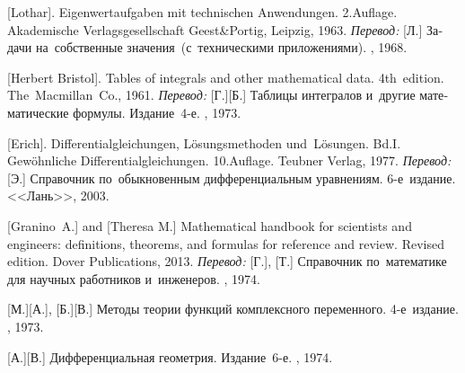 \begin{thebibliography}{123}
\begin{otherlanguage}{russian}

[Lothar]. Eigenwertaufgaben mit technischen Anwendungen. 2.\:Auflage. Akademische Verlagsgesellschaft Geest\;\&\;Portig, Leipzig, 1963. 
\emph{Перевод:} [Л.] Задачи на~собственные значения~(с~техническими приложениями). \naukapublisher, 1968. 

[Herbert Bristol]. Tables of integrals and other mathematical data. 4th~edition. The~Macmillan~Co., 1961. 
\emph{Перевод:} [Г.][Б.] Таблицы интегралов и~другие математические формулы. Издание~4\hbox{-}е. \naukapublisher, 1973. 

[Erich]. Differentialgleichungen, Lösungsmethoden und~Lö\-sun\-gen. Bd.\:I. Gewöhnliche Differentialgleichungen. 10.\:Auflage. Teubner Verlag, 1977. 
\emph{Перевод:} [Э.] Справочник по~обыкновенным дифференциальным уравнениям. 6\hbox{-}е~издание. <<Лань>>, 2003. 

[Granino~A.] and [Theresa M.]
Mathematical handbook for scientists and engineers: definitions, theorems, and formulas for reference and review.
Revised edition. Dover Publications, 2013. 
\emph{Перевод:}
[Г.],
[Т.]
Справочник по~математике для научных работников и~инженеров.
\naukapublisher,
1974.

[М.][А.],
[Б.][В.]
Методы теории функций комплексного переменного.
4\hbox{-}е~издание.
\naukapublisher,
1973.

[А.][В.]
Дифференциальная геометрия.
Издание~6\hbox{-}е.
\naukapublisher,
1974.

\end{otherlanguage}

\normalsize
\end{thebibliography}

